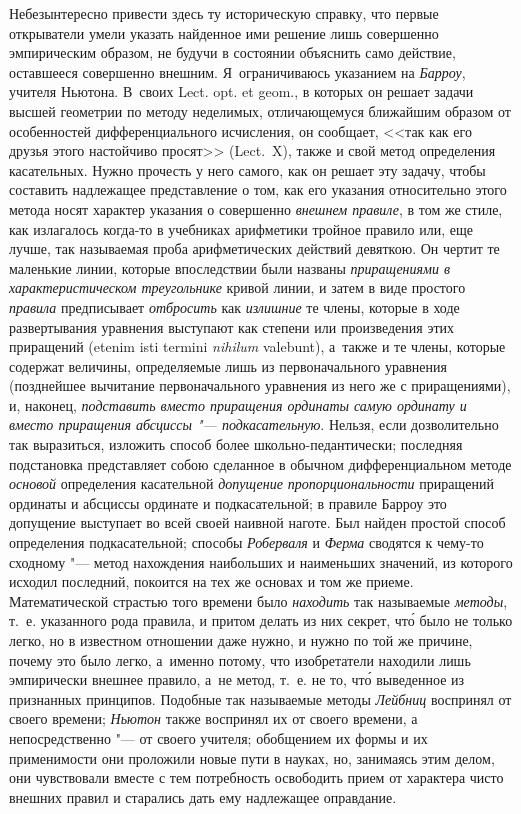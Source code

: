 Небезынтересно привести здесь ту историческую справку, что первые открыватели
умели указать найденное ими решение лишь совершенно эмпирическим образом, не
будучи в состоянии объяснить само действие, оставшееся совершенно внешним.
Я~ограничиваюсь указанием на {\em Барроу}, учителя Ньютона. В~своих Lect. opt.
et geom., в которых он решает задачи высшей геометрии по методу неделимых,
отличающемуся ближайшим образом от особенностей дифференциального исчисления,
он сообщает, <<так как его друзья этого настойчиво просят>> (Lect.~X), также и
свой метод определения касательных. Нужно прочесть у него самого, как он решает
эту задачу, чтобы составить надлежащее представление о том, как его указания
относительно этого метода носят характер указания о совершенно {\em внешнем
правиле}, в том же стиле, как излагалось когда-то в учебниках арифметики
тройное правило или, еще лучше, так называемая проба арифметических действий
девяткою. Он чертит те маленькие линии, которые впоследствии были
названы {\em приращениями в характеристическом треугольнике} кривой линии, и
затем в виде простого {\em правила} предписывает {\em отбросить} как
{\em излишние} те члены, которые в ходе развертывания уравнения выступают как
степени или произведения этих приращений (etenim isti termini {\em nihilum}
vale\-bunt), а~также
и те члены, которые содержат величины, определяемые лишь из первоначального
уравнения (позднейшее вычитание первоначального уравнения из него же с
приращениями), и, наконец, {\em подставить вместо приращения ординаты самую
ординату и вместо приращения абсциссы "--- подкасательную}. Нельзя, если
дозволительно так выразиться, изложить способ более школьно-педантически;
последняя подстановка представляет собою сделанное в обычном дифференциальном
методе {\em основой} определения касательной {\em допущение пропорциональности}
приращений ординаты и абсциссы ординате и подкасательной; в правиле Барроу это
допущение выступает во всей своей наивной наготе. Был найден простой способ
определения подкасательной; способы {\em Роберваля} и {\em Ферма} сводятся к
чему-то сходному "--- метод нахождения наибольших и наименьших значений, из
которого исходил последний, покоится на тех же основах и том же приеме.
Математической страстью того времени было {\em находить} так называемые
{\em методы}, т.~е. указанного рода правила, и притом делать из них секрет,
чт\'{о} было не только легко, но в известном отношении даже нужно, и нужно по
той же причине, почему это было легко, а~именно потому, что изобретатели
находили лишь эмпирически внешнее правило, а~не метод, т.~е. не то, чт\'{о}
выведенное из признанных принципов. Подобные так называемые методы
{\em Лейбниц} воспринял от своего времени; {\em Ньютон} также воспринял их
от своего времени, а непосредственно "--- от своего учителя; обобщением их
формы и их применимости они проложили новые пути в науках, но, занимаясь этим
делом, они чувствовали вместе с тем потребность освободить прием от характера
чисто внешних правил и старались дать ему надлежащее оправдание.

